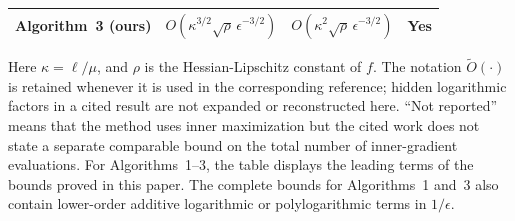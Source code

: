 \begin{table}[t]
\begin{tabularx}{\textwidth}{@{}
    >{\raggedright\arraybackslash}X
    >{\centering\arraybackslash}p{}
    >{\centering\arraybackslash}p{}
    >{\centering\arraybackslash}p{}
@{}}
\textbf{Algorithm~3 (ours)}
&
$O\!\left(
\kappa^{3/2}\sqrt{\rho}\,
\epsilon^{-3/2}
\right)$
&
$O\!\left(
\kappa^2\sqrt{\rho}\,
\epsilon^{-3/2}
\right)$
&
\textbf{Yes}
\\

\bottomrule
\end{tabularx}

\vspace{1mm}
\begin{minipage}{0.97\textwidth}
\footnotesize
Here $\kappa=\ell/\mu$, and $\rho$ is the Hessian-Lipschitz constant
of $f$. The notation $\widetilde O(\cdot)$ is retained whenever it is
used in the corresponding reference; hidden logarithmic factors in a
cited result are not expanded or reconstructed here.
``Not reported'' means that the method uses inner maximization but the
cited work does not state a separate comparable bound on the total
number of inner-gradient evaluations.
For Algorithms~1--3, the table displays the leading terms of the
bounds proved in this paper. The complete bounds for Algorithms~1
and~3 also contain lower-order additive logarithmic or polylogarithmic
terms in $1/\epsilon$.
\end{minipage}
\end{table}
